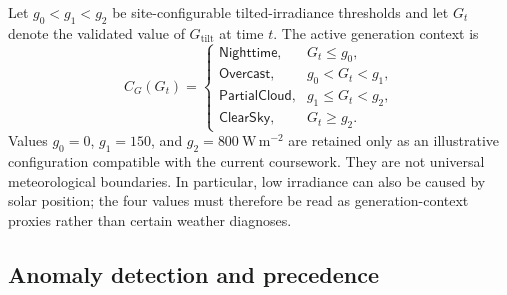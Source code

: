 \documentclass[
	letterpaper,
	10pt,
	unnumberedsections,
	twoside,
]{LTJournalArticle}
\newcommand{\valueof}[1]{\textsf{#1}}
\begin{document}
Let $g_0<g_1<g_2$ be site-configurable tilted-irradiance thresholds and let $G_t$ denote the validated value of $G_{\mathrm{tilt}}$ at time $t$. The active generation context is
\begin{equation}
C_G(G_t)=
\begin{cases}
\valueof{Nighttime}, & G_t\leq g_0,\\
\valueof{Overcast}, & g_0<G_t<g_1,\\
\valueof{PartialCloud}, & g_1\leq G_t<g_2,\\
\valueof{ClearSky}, & G_t\geq g_2.
\end{cases}
\label{eq:generation-context}
\end{equation}
Values $g_0=0$, $g_1=150$, and $g_2=800\ \mathrm{W\,m^{-2}}$ are retained only as an illustrative configuration compatible with the current coursework. They are not universal meteorological boundaries. In particular, low irradiance can also be caused by solar position; the four values must therefore be read as generation-context proxies rather than certain weather diagnoses.

\subsection{Anomaly detection and precedence}
\end{document}
